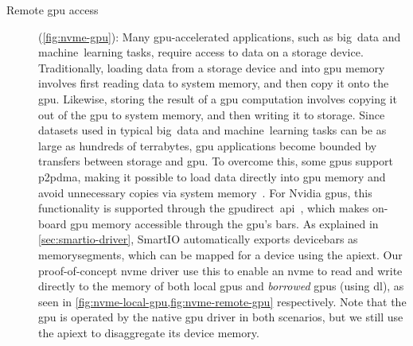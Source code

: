 \begin{description}
    \item[Remote \gls{gpu} access] (\cref{fig:nvme-gpu}):
        Many \gls{gpu}-accelerated applications, such as big~data and machine~learning tasks, require access to data on a storage device.
        Traditionally, loading data from a storage device and into \gls{gpu} memory involves first reading data to system memory, and then copy it onto the \gls{gpu}.
        Likewise, storing the result of a \gls{gpu} computation involves copying it out of the \gls{gpu} to system memory, and then writing it to storage.
        Since datasets used in typical big~data and machine~learning tasks can be as large as hundreds of terrabytes, \gls{gpu} applications become bounded by transfers between storage and \gls{gpu}.
        To overcome this, some \glspl{gpu} support \gls{p2pdma}, making it possible to load data directly into \gls{gpu} memory and avoid unnecessary copies via system memory~\cite{Bergman2019,url:Thompson2019}.
        For Nvidia \glspl{gpu}, this functionality is supported through the \gls{gpudirect}~\gls{api}~\cite{url:GPUDirect}, which makes on-board \gls{gpu} memory accessible through the \gls{gpu}'s \glspl{bar}.
        As explained in \cref{sec:smartio-driver}, SmartIO automatically exports \glspl{devicebar} as \glspl{memorysegment}, which can be mapped for a device using the \gls{apiext}.
        Our proof-of-concept \gls{nvme} driver use this to enable an \gls{nvme} to read and write directly to the memory of both local \glspl{gpu} and \emph{borrowed} \glspl{gpu} (using \gls{dl}), as seen in \cref{fig:nvme-local-gpu,fig:nvme-remote-gpu} respectively.
        Note that the \gls{gpu} is operated by the native \gls{gpu} driver in both scenarios, but we still use the \gls{apiext} to disaggregate its device memory.


\end{description}
